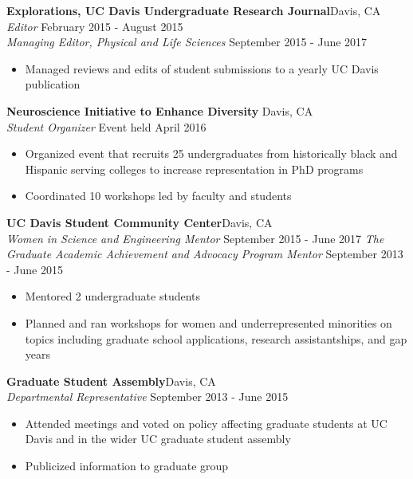 \documentclass[line,margin,10pt]{res}
\begin{document}
\begin{resume}
\textbf{Explorations, UC Davis Undergraduate Research Journal}\hfill Davis, CA\\{\sl Editor} \hfill February 2015 - August 2015\\
{\sl Managing Editor, Physical and Life Sciences} \hfill September 2015 - June 2017
\begin{itemize}\itemsep -2pt
\item Managed reviews and edits of student submissions to a yearly UC Davis publication
\end{itemize}

 \textbf{Neuroscience Initiative to Enhance Diversity} \hfill
Davis, CA\\
{\sl Student Organizer} \hfill Event held April 2016
\begin{itemize}\itemsep -2pt
\item Organized event that recruits 25 undergraduates from historically black and Hispanic serving colleges to increase representation in PhD programs
\item Coordinated 10 workshops led by faculty and students
\end{itemize}

\textbf{UC Davis Student Community Center}\hfill Davis, CA \\
{\sl Women in Science and Engineering Mentor} \hfill September 2015 - June 2017
{\sl The Graduate Academic Achievement and Advocacy Program Mentor} \hfill September 2013 - June 2015
\begin{itemize}
\item Mentored 2 undergraduate students
\item Planned and ran workshops for women and underrepresented minorities on topics including graduate school applications, research assistantships, and gap years
\end{itemize}

\textbf{Graduate Student Assembly}\hfill Davis, CA\\{\sl Departmental Representative} \hfill September 2013 - June 2015
\begin{itemize}
\item Attended meetings and voted on policy affecting graduate students at UC Davis and in the wider UC graduate student assembly
\item Publicized information to graduate group
\end{itemize}
 

\end{resume}
\end{document}

